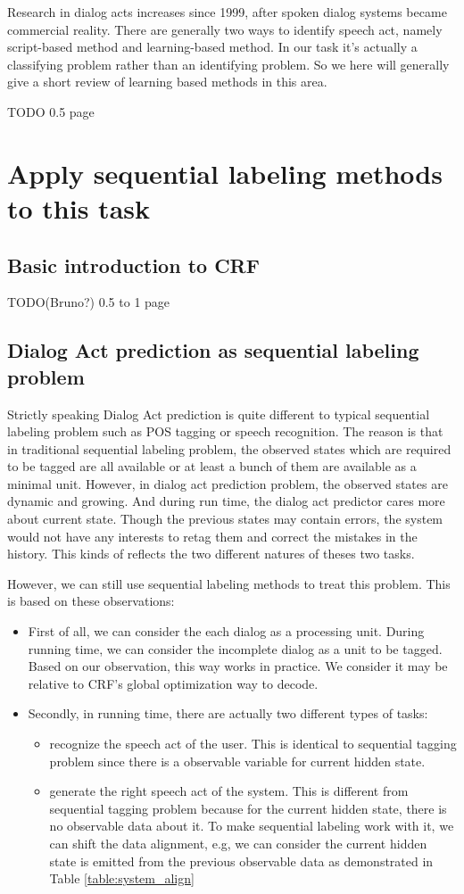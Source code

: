 \documentclass[a4paper]{article}
\begin{document}
Research in dialog acts increases since 1999, after spoken dialog  systems became commercial reality. There are generally two ways to identify speech act, namely script-based method and learning-based method. In our task it's actually a classifying problem rather than an identifying problem. So we here will generally give a short review of learning based methods in this area.

TODO
0.5 page
\section{Apply sequential labeling methods to this task}
\subsection{Basic introduction to CRF}
TODO(Bruno?)
0.5 to 1 page
\subsection{Dialog Act prediction as sequential labeling problem}
Strictly speaking Dialog Act prediction is quite different to typical sequential labeling problem such as POS tagging or speech recognition. The reason is that in traditional sequential labeling problem, the observed states which are required to be tagged are all available or at least a bunch of them are available as a minimal unit. However, in dialog act prediction problem, the observed states are dynamic and growing. And during run time, the dialog act predictor cares more about current state. Though the previous states may contain errors, the system would not have any interests to retag them and correct the mistakes in the history. This kinds of reflects the two different natures of theses two tasks.

However, we can still use sequential labeling methods to treat this problem. This is based on these observations:
\begin{itemize}
    \item First of all, we can consider the each dialog as a processing unit. During running time, we can consider the incomplete dialog as a unit to be tagged. Based on our observation, this way works in practice. We consider it may be relative to CRF's global optimization way to decode. 
    \item Secondly, in running time, there are actually two different types of tasks:
        \begin{itemize}
            \item recognize the speech act of the user. This is identical to sequential tagging problem since there is a observable variable for current hidden state.
            \item generate the right speech act of the system. This is different from sequential tagging problem because for the current hidden state, there is no observable data about it. To make sequential labeling work with it, we can shift the data alignment, e.g, we can consider the current hidden state is emitted from the previous observable data as demonstrated in Table \ref{table:system_align} 
        \end{itemize}
\end{itemize}
\end{document}
